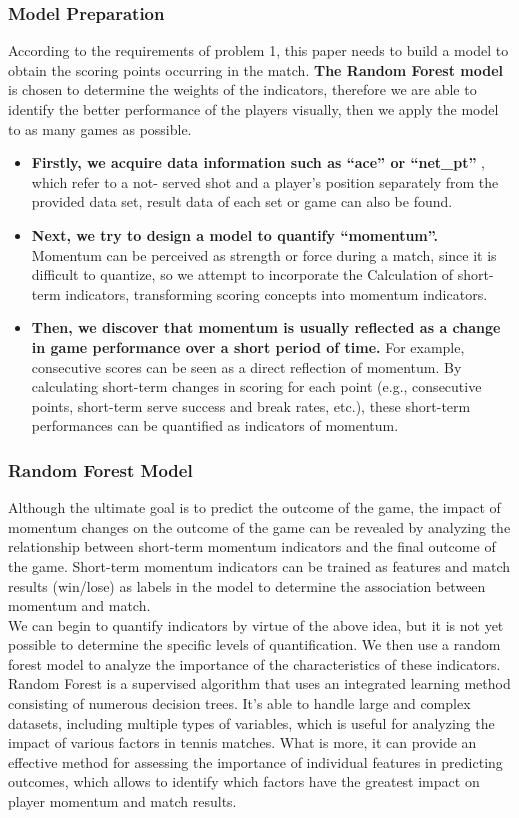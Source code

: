 \documentclass{mcmthesis}
\begin{document}
\subsubsection{Model Preparation}
According to the requirements of problem 1, this paper needs to build a model to obtain the
scoring points occurring in the match. {\bf The Random Forest model} is chosen to determine the
weights of the indicators, therefore we are able to identify the better performance of the players
visually, then we apply the model to as many games as possible.
\begin{itemize}
    \item {\bf Firstly, we acquire data information such as “ace” or “net\_pt” }, which refer to a not- served shot and a player’s position separately from the provided data set, result data of each set
    or game can also be found.
    \item {\bf Next, we try to design a model to quantify “momentum”.} Momentum can be perceived as
    strength or force during a match, since it is difficult to quantize, so we attempt to incorporate the
    Calculation of short-term indicators, transforming scoring concepts into momentum indicators. 
    \item {\bf Then, we discover that momentum is usually reflected as a change in game
    performance over a short period of time. }For example, consecutive scores can be seen as a
    direct reflection of momentum. By calculating short-term changes in scoring for each point
    (e.g., consecutive points, short-term serve success and break rates, etc.), these short-term
    performances can be quantified as indicators of momentum.
\end{itemize}

\subsubsection{Random Forest Model}
Although the ultimate goal is to predict the outcome of the game, the impact of momentum
changes on the outcome of the game can be revealed by analyzing the relationship between short-term momentum indicators and the final outcome of the game. Short-term momentum indicators
can be trained as features and match results (win/lose) as labels in the model to determine the
association between momentum and match. \\
We can begin to quantify indicators by virtue of the above idea, but it is not yet possible to
determine the specific levels of quantification. We then use a random forest model to analyze the
importance of the characteristics of these indicators. \\
Random Forest is a supervised algorithm that uses an integrated learning method consisting
of numerous decision trees. It's able to handle large and complex datasets, including multiple
types of variables, which is useful for analyzing the impact of various factors in tennis matches. What is more, it can provide an effective method for assessing the importance of individual
features in predicting outcomes, which allows to identify which factors have the greatest impact
on player momentum and match results.\cite{4}
\end{document}
